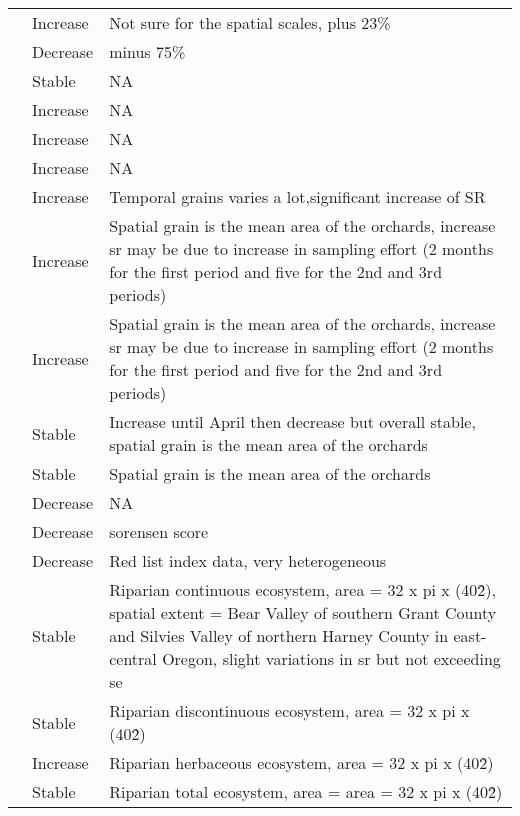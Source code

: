 \documentclass[
  12pt,
  oneside]{report}
\begin{document}
\begin{landscape}
\begin{longtable}[t]{ll>{\raggedright\arraybackslash}p{40em}}
\cite{jiguet_french_2012} & Increase & Not sure for the spatial scales, plus 23\%\\
\cite{jiguet_french_2012} & Decrease & minus 75\%\\
\addlinespace
\cite{keten_temporal_nodate} & Stable & NA\\
\cite{davey_rise_2012} & Increase & \vphantom{2} NA\\
\cite{davey_rise_2012} & Increase & \vphantom{1} NA\\
\cite{davey_rise_2012} & Increase & NA\\
\cite{christian_more_2009} & Increase & Temporal grains varies a lot,significant increase of SR\\
\addlinespace
\cite{dittrich_multiyear_2019} & Increase & Spatial grain is the mean area of the orchards, increase sr may be due to increase in sampling effort (2 months for the first period and five for the 2nd and 3rd \vphantom{1} periods)\\
\cite{dittrich_multiyear_2019} & Increase & Spatial grain is the mean area of the orchards, increase sr may be due to increase in sampling effort (2 months for the first period and five for the 2nd and 3rd periods)\\
\cite{dittrich_multiyear_2019} & Stable & Increase until April then decrease but overall stable, spatial grain is the mean area of the orchards\\
\cite{dittrich_multiyear_2019} & Stable & Spatial grain is the mean area of the orchards\\
\cite{sirami_changes_2012} & Decrease & NA\\
\addlinespace
\cite{garcia-navas_temporal_2020} & Decrease & sorensen score\\
\cite{mcgeoch_global_2010} & Decrease & Red list index data, very heterogeneous\\
\cite{ellis_twenty-year_2019} & Stable & Riparian continuous ecosystem, area = 32 x pi x (40\^2), spatial extent = Bear Valley of southern Grant County and Silvies Valley of northern Harney County in east-central Oregon, slight variations in sr but not exceeding se\\
\cite{ellis_twenty-year_2019} & Stable & Riparian discontinuous ecosystem, area = 32 x pi x (40\^2)\\
\cite{ellis_twenty-year_2019} & Increase & Riparian herbaceous ecosystem, area = 32 x pi x \vphantom{1} (40\^2)\\
\addlinespace
\cite{ellis_twenty-year_2019} & Stable & Riparian total ecosystem, area = area = 32 x pi x (40\^2)\\

\end{longtable}
\end{landscape}
\end{document}
